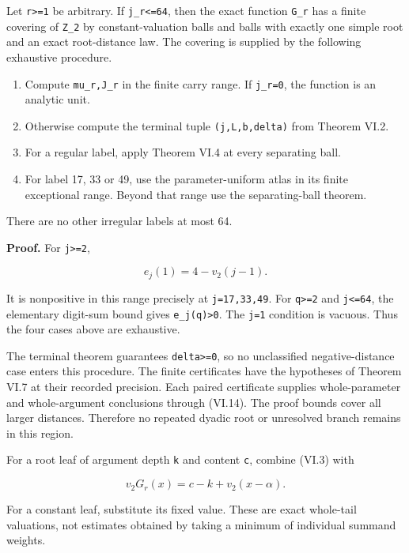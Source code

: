 \documentclass[11pt,letterpaper]{article}
\providecommand{\tightlist}{\setlength{\itemsep}{0pt}\setlength{\parskip}{0pt}}
\begin{document}
Let \texttt{r\textgreater{}=1} be arbitrary. If \texttt{j\_r\textless{}=64}, then the exact function \texttt{G\_r} has a finite covering of \texttt{Z\_2} by constant-valuation balls and balls with exactly one simple root and an exact root-distance law. The covering is supplied by the following exhaustive procedure.

\begin{enumerate}
\def\labelenumi{\arabic{enumi}.}
\tightlist
\item
  Compute \texttt{mu\_r,J\_r} in the finite carry range. If \texttt{j\_r=0}, the function is an analytic unit.
\item
  Otherwise compute the terminal tuple \texttt{(j,L,b,delta)} from Theorem VI.2.
\item
  For a regular label, apply Theorem VI.4 at every separating ball.
\item
  For label 17, 33 or 49, use the parameter-uniform atlas in its finite exceptional range. Beyond that range use the separating-ball theorem.
\end{enumerate}

There are no other irregular labels at most 64.

\textbf{Proof.} For \texttt{j\textgreater{}=2},

\[
e_j(1)=4-v_2(j-1).
\]

It is nonpositive in this range precisely at \texttt{j=17,33,49}. For \texttt{q\textgreater{}=2} and \texttt{j\textless{}=64}, the elementary digit-sum bound gives \texttt{e\_j(q)\textgreater{}0}. The \texttt{j=1} condition is vacuous. Thus the four cases above are exhaustive.

The terminal theorem guarantees \texttt{delta\textgreater{}=0}, so no unclassified negative-distance case enters this procedure. The finite certificates have the hypotheses of Theorem VI.7 at their recorded precision. Each paired certificate supplies whole-parameter and whole-argument conclusions through (VI.14). The proof bounds cover all larger distances. Therefore no repeated dyadic root or unresolved branch remains in this region.

For a root leaf of argument depth \texttt{k} and content \texttt{c}, combine (VI.3) with

\[
v_2G_r(x)=c-k+v_2(x-\alpha).
\]

For a constant leaf, substitute its fixed value. These are exact whole-tail valuations, not estimates obtained by taking a minimum of individual summand weights.

\end{document}
